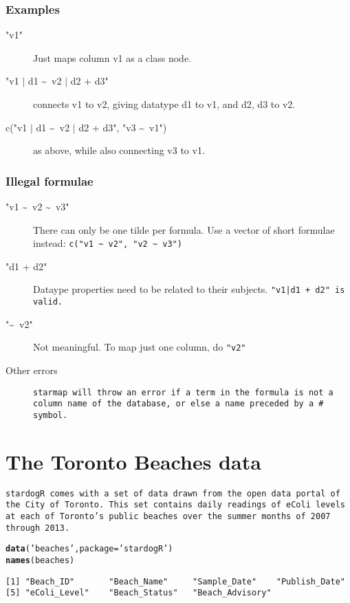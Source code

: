 \documentclass{article}\usepackage[]{graphicx}\usepackage[]{xcolor}
\makeatletter
\newcommand{\hlstr}[1]{\textcolor[rgb]{0.192,0.494,0.8}{#1}}%
\newcommand{\hlstd}[1]{\textcolor[rgb]{0.345,0.345,0.345}{#1}}%
\newcommand{\hlkwc}[1]{\textcolor[rgb]{0.333,0.667,0.333}{#1}}%
\newcommand{\hlkwd}[1]{\textcolor[rgb]{0.737,0.353,0.396}{\textbf{#1}}}%
\newenvironment{kframe}{%
 \def\at@end@of@kframe{}%
 \ifinner\ifhmode%
  \def\at@end@of@kframe{\end{minipage}}%
  \begin{minipage}{\columnwidth}%
 \fi\fi%
 \def\FrameCommand##1{\hskip\@totalleftmargin \hskip-\fboxsep
 \colorbox{shadecolor}{##1}\hskip-\fboxsep
     \hskip-\linewidth \hskip-\@totalleftmargin \hskip\columnwidth}%
 \MakeFramed {\advance\hsize-\width
   \@totalleftmargin\z@ \linewidth\hsize
   \@setminipage}}%
 {\par\unskip\endMakeFramed%
 \at@end@of@kframe}
\newenvironment{knitrout}{}{} %
\makeatother
\begin{document}
\subsubsection{Examples}

\begin{description}
  \item["v1"] Just maps column v1 as a class node.
  \item["v1 $\vert$ d1 \textasciitilde\ v2 $\vert$ d2 + d3"] connects v1 to v2, giving datatype d1 to v1, and d2, d3 to v2.
  \item[c("v1 $\vert$ d1 \textasciitilde\ v2 $\vert$ d2 + d3", "v3  \textasciitilde\ v1")] as above, while also connecting v3 to v1.
\end{description}

\subsubsection{Illegal formulae}

\begin{description}
  \item["v1 \textasciitilde\ v2 \textasciitilde\ v3"] There can only be one tilde per formula. Use a vector of short formulae instead: \tt{c("v1 \textasciitilde\ v2", "v2 \textasciitilde\ v3")}
  \item["d1 + d2"] Dataype properties need to be related to their subjects. \tt{"v1|d1 + d2"} is valid.
  \item["\textasciitilde\ v2"] Not meaningful. To map just one column, do \tt{"v2"}
  \item[Other errors] \tt{starmap} will throw an error if a term in the formula is not a column name of the database, or else a name preceded by a \# symbol.
\end{description}


\section{The Toronto Beaches data }

\tt{stardogR} comes with a set of data drawn from the open data portal of the City of Toronto. This set contains daily readings of eColi levels at each of Toronto's public beaches over the summer months of 2007 through 2013.

\begin{knitrout}
\color{fgcolor}\begin{kframe}
\begin{alltt}
\hlkwd{data}\hlstd{(}\hlstr{'beaches'}\hlstd{,} \hlkwc{package} \hlstd{=} \hlstr{'stardogR'}\hlstd{)}
\hlkwd{names}\hlstd{(beaches)}
\end{alltt}
\begin{verbatim}
[1] "Beach_ID"       "Beach_Name"     "Sample_Date"    "Publish_Date"  
[5] "eColi_Level"    "Beach_Status"   "Beach_Advisory"
\end{verbatim}
\end{kframe}
\end{knitrout}
\end{document}
